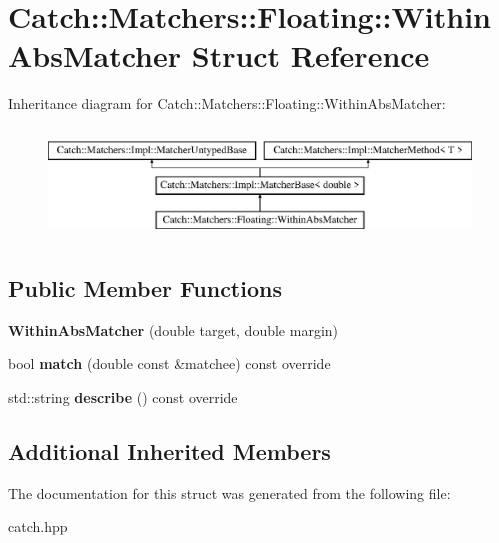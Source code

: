 \hypertarget{structCatch_1_1Matchers_1_1Floating_1_1WithinAbsMatcher}{}\section{Catch\+::Matchers\+::Floating\+::Within\+Abs\+Matcher Struct Reference}
\label{structCatch_1_1Matchers_1_1Floating_1_1WithinAbsMatcher}
Inheritance diagram for Catch\+::Matchers\+::Floating\+::Within\+Abs\+Matcher\+:\begin{figure}[H]
\begin{center}
\leavevmode
\includegraphics[height=2.968198cm]{structCatch_1_1Matchers_1_1Floating_1_1WithinAbsMatcher}
\end{center}
\end{figure}
\subsection*{Public Member Functions}
\begin{DoxyCompactItemize}
\item 
\mbox{\label{structCatch_1_1Matchers_1_1Floating_1_1WithinAbsMatcher_ac45340b98c41230a7def5bd86c2d870f}} 
{\bfseries Within\+Abs\+Matcher} (double target, double margin)
\item 
\mbox{\label{structCatch_1_1Matchers_1_1Floating_1_1WithinAbsMatcher_afa5d8eed57f12c1e5d006471eb0bfe72}} 
bool {\bfseries match} (double const \&matchee) const override
\item 
\mbox{\label{structCatch_1_1Matchers_1_1Floating_1_1WithinAbsMatcher_a206a738680f8767af31d3f1835afff3f}} 
std\+::string {\bfseries describe} () const override
\end{DoxyCompactItemize}
\subsection*{Additional Inherited Members}


The documentation for this struct was generated from the following file\+:\begin{DoxyCompactItemize}
\item 
catch.\+hpp\end{DoxyCompactItemize}

